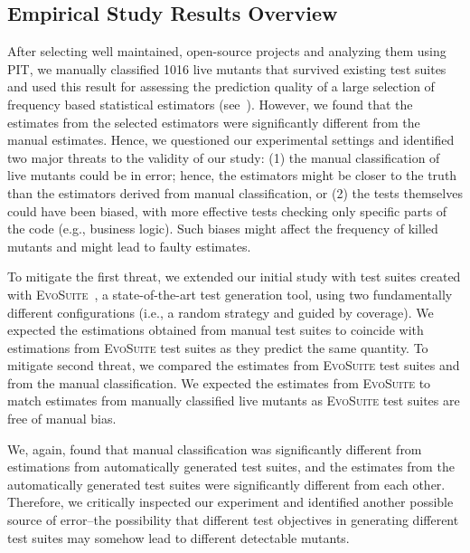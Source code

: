 \documentclass[sigconf,review,anonymous]{acmart}
\newcommand{\Evosuite}{\textsc{EvoSuite}\xspace}
\begin{document}
\subsection{Empirical Study Results Overview}
After selecting well maintained, open-source projects and analyzing them
using PIT, we manually classified 1016 live mutants that survived existing test suites and used this result for assessing the prediction quality of
a large selection of frequency based statistical estimators (see~).
However, we found that
the estimates from the selected estimators
were significantly different from the manual estimates.
Hence, we questioned our experimental settings
and identified two major threats to the validity of our study:
(1) the manual classification of live mutants could be in error; hence, the
estimators might be closer to the truth than the estimators derived from manual
classification, or
%
%
(2) the tests themselves could have been biased, with more effective tests checking
 only specific parts of the code (e.g., business logic).
Such biases might affect the frequency of killed mutants and might lead to faulty estimates.

To mitigate the first threat, we extended our initial study with test suites created with
\Evosuite~\cite{fraser2011evosuite}, a state-of-the-art test generation tool,
using two fundamentally different configurations (i.e., a random strategy and guided by coverage).
We expected the estimations obtained from manual test suites
to coincide with estimations from \Evosuite test suites
as they predict the same quantity.
%
To mitigate second threat, we compared the estimates from \Evosuite
test suites and from the manual classification. We expected
the estimates from \Evosuite to match estimates from manually classified live
mutants as \Evosuite test suites are free of manual bias. %

We, again, found that manual classification was significantly different from
estimations from automatically generated test suites, and the estimates from the automatically
generated test suites %
were significantly different from each other.
Therefore, we critically inspected our experiment and identified another
possible source of error--the possibility that different test objectives
in generating different test suites may somehow lead to different
detectable mutants.
\end{document}
